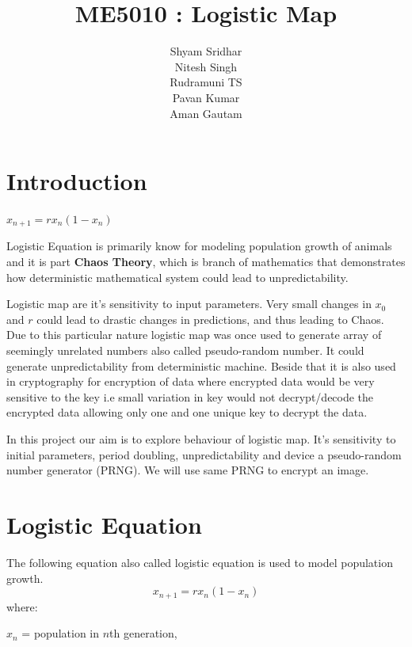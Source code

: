 \documentclass{report}
\title{\textbf{ME5010 : Logistic Map}}
\begin{document}
\author{Shyam Sridhar\\ Nitesh Singh \\ Rudramuni TS \\ Pavan Kumar \\ Aman Gautam }
\maketitle

\section{Introduction}

\begin{center}$x_{n+1} = rx_n(1-x_n)$\end{center}
Logistic Equation is primarily know for modeling population growth of animals and it is part \textbf{Chaos Theory}, which is branch of mathematics that demonstrates how deterministic mathematical system could lead to unpredictability.

Logistic map are it's sensitivity to input parameters. Very small changes in $x_0$ and $r$ could lead to drastic changes in predictions, and thus leading to Chaos. Due to this particular nature logistic map was once used to generate array of seemingly unrelated numbers also called pseudo-random number. It could generate unpredictability from deterministic machine. Beside that it is also used in cryptography for encryption of data where encrypted data would be very sensitive to the key i.e small variation in key would not decrypt/decode the encrypted data allowing only one and one unique key to decrypt the data.

In this project our aim is to explore behaviour of logistic map. It's sensitivity to initial parameters, period doubling, unpredictability and device a pseudo-random number generator (PRNG). We will use same PRNG to encrypt an image.



\newpage
\section{Logistic Equation}

The following equation also called logistic equation is used to model population growth.
\begin{equation}
x_{n+1} = rx_n(1-x_n)
\end{equation}
where:

$x_n$ = population in $n$th generation,
\end{document}

